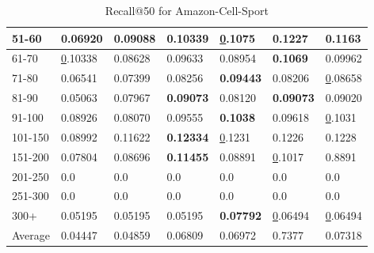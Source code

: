 \begin{table*}[]
\begin{tabular}{|l|l|l|l|l|l|l|}
        51-60     & 0.06920                        & 0.09088                        & 0.10339                        & {\ul 0.1075}                   & \textbf{0.1227}                & 0.1163                         \\ \hline
        61-70     & {\ul 0.10338}                  & 0.08628                        & 0.09633                        & 0.08954                        & \textbf{0.1069}                & 0.09962                        \\ \hline
        71-80     & 0.06541                        & 0.07399                        & 0.08256                        & \textbf{0.09443}               & 0.08206                        & {\ul 0.08658}                  \\ \hline
        81-90     & 0.05063                        & 0.07967                        & \textbf{0.09073}               & 0.08120                        & \textbf{0.09073}               & 0.09020                        \\ \hline
        91-100    & 0.08926                        & 0.08070                        & 0.09555                        & \textbf{0.1038}                & 0.09618                        & {\ul 0.1031}                   \\ \hline
        101-150   & 0.08992                        & 0.11622                        & \textbf{0.12334}               & {\ul 0.1231}                   & 0.1226                         & 0.1228                         \\ \hline
        151-200   & 0.07804                        & 0.08696                        & \textbf{0.11455}               & 0.08891                        & {\ul 0.1017}                   & 0.8891                         \\ \hline
        201-250   & 0.0                            & 0.0                            & 0.0                            & 0.0                            & 0.0                            & 0.0                            \\ \hline
        251-300   & 0.0                            & 0.0                            & 0.0                            & 0.0                            & 0.0                            & 0.0                            \\ \hline
        300+      & 0.05195                        & 0.05195                        & 0.05195                        & \textbf{0.07792}               & {\ul 0.06494}                  & {\ul 0.06494}                  \\ \hline
        Average   & 0.04447                        & 0.04859                        & 0.06809                        & 0.06972                        & 0.7377                         & 0.07318                        \\ \hline
    \end{tabular}
    \caption{Recall@50 for Amazon-Cell-Sport}
    \label{tab:Amazon-Cell-Sport-recall-evaluation}
\end{table*}